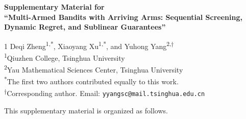 \documentclass[
  12pt]{article}
\newcommand{\anon}{1}
\begin{document}
\begin{center}

{\large\bf Supplementary Material for \\ “Multi-Armed Bandits with Arriving Arms: Sequential Screening, Dynamic Regret, and Sublinear Guarantees”}

\anon
Deqi Zheng\textsuperscript{1,*},
Xiaoyang Xu\textsuperscript{1,*},
and Yuhong Yang\textsuperscript{2,$\dagger$}\\[0.4em]

\textsuperscript{1}Qiuzhen College, Tsinghua University\\
\textsuperscript{2}Yau Mathematical Sciences Center, Tsinghua University\\[0.4em]
{\footnotesize
\textsuperscript{*}The first two authors contributed equally to this work.\\
\textsuperscript{$\dagger$}Corresponding author. Email: \texttt{yyangsc@mail.tsinghua.edu.cn}
}
\fi

\end{center}

This supplementary material is organized as follows.
\end{document}
